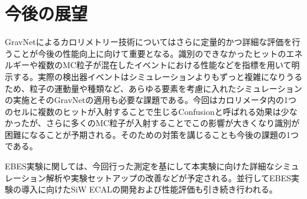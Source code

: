 \section{今後の展望}
GravNetによるカロリメトリー技術についてはさらに定量的かつ詳細な評価を行うことが今後の性能向上に向けて重要となる。識別のできなかったヒットのエネルギーや複数のMC粒子が混在したイベントにおける性能などを指標を用いて明示する。実際の検出器イベントはシミュレーションよりもずっと複雑になりうるため、粒子の運動量や種類など、あらゆる要素を考慮に入れたシミュレーションの実施とそのGravNetの適用も必要な課題である。今回はカロリメータ内の1つのセルに複数のヒットが入射することで生じるConfusionと呼ばれる効果は少なかったが、さらに多くのMC粒子が入射することでこの影響が大きくなり識別が困難になることが予期される。そのための対策を講じることも今後の課題の1つである。

EBES実験に関しては、今回行った測定を基にして本実験に向けた詳細なシミュレーション解析や実験セットアップの改善などが予定される。並行してEBES実験の導入に向けたSiW ECALの開発および性能評価も引き続き行われる。


